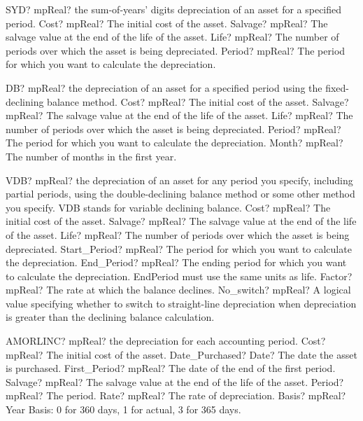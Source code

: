\documentclass[12pt,a4paper,openany]{book}
\begin{document}
\begin{mpFunctionsExtract}
\mpWorksheetFunctionFourNotImplemented
{SYD? mpReal? the sum-of-years' digits depreciation of an asset for a specified period.}
{Cost? mpReal?  The initial cost of the asset.}
{Salvage? mpReal? The salvage value at the end of the life of the asset.}
{Life? mpReal? The number of periods over which the asset is being depreciated.}
{Period? mpReal? The period for which you want to calculate the depreciation.}
\end{mpFunctionsExtract}

\begin{mpFunctionsExtract}
\mpWorksheetFunctionFiveNotImplemented
{DB? mpReal? the depreciation of an asset for a specified period using the fixed-declining balance method.}
{Cost? mpReal?  The initial cost of the asset.}
{Salvage? mpReal? The salvage value at the end of the life of the asset.}
{Life? mpReal? The number of periods over which the asset is being depreciated.}
{Period? mpReal? The period for which you want to calculate the depreciation.}
{Month? mpReal? The number of months in the first year.}
\end{mpFunctionsExtract}

\begin{mpFunctionsExtract}
\mpWorksheetFunctionSevenNotImplemented
{VDB? mpReal? the depreciation of an asset for any period you specify, including partial periods, using the double-declining balance method or some other method you specify. VDB stands for variable declining balance.}
{Cost? mpReal?  The initial cost of the asset.}
{Salvage? mpReal? The salvage value at the end of the life of the asset.}
{Life? mpReal? The number of periods over which the asset is being depreciated.}
{Start\_Period? mpReal? The period for which you want to calculate the depreciation.}
{End\_Period? mpReal? The ending period for which you want to calculate the depreciation. EndPeriod must use the same units as life.}
{Factor? mpReal? The rate at which the balance declines.}
{No\_switch? mpReal? A logical value specifying whether to switch to straight-line depreciation when depreciation is greater than the declining balance calculation.}
\end{mpFunctionsExtract}

\begin{mpFunctionsExtract}
\mpWorksheetFunctionSevenNotImplemented
{AMORLINC? mpReal? the depreciation for each accounting period.}
{Cost? mpReal?  The initial cost of the asset.}
{Date\_Purchased? Date? The date the asset is purchased.}
{First\_Period? mpReal? The date of the end of the first period.}
{Salvage? mpReal? The salvage value at the end of the life of the asset.}
{Period? mpReal? The period.}
{Rate? mpReal? The rate of depreciation.}
{Basis? mpReal? Year Basis: 0 for 360 days, 1 for actual, 3 for 365 days.}
\end{mpFunctionsExtract}
\end{document}
